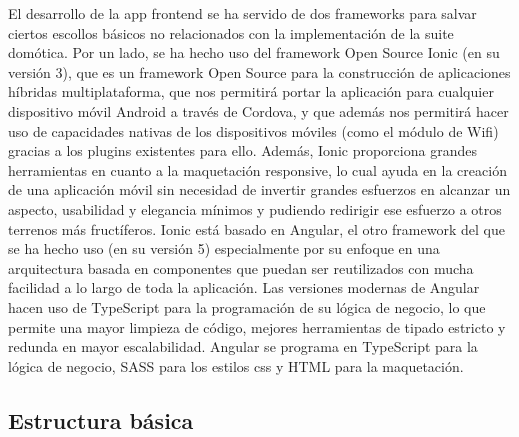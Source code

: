 El desarrollo de la app frontend se ha servido de dos frameworks para salvar ciertos escollos básicos no relacionados con la implementación de la suite domótica. Por un lado, se ha hecho uso del framework Open Source Ionic (en su versión 3), que es un framework Open Source para la construcción de aplicaciones híbridas multiplataforma, que nos permitirá portar la aplicación para cualquier dispositivo móvil Android a través de Cordova, y que además nos permitirá hacer uso de capacidades nativas de los dispositivos móviles (como el módulo de Wifi) gracias a los plugins existentes para ello. Además, Ionic proporciona grandes herramientas en cuanto a la maquetación responsive, lo cual ayuda en la creación de una aplicación móvil sin necesidad de invertir grandes esfuerzos en alcanzar un aspecto, usabilidad y elegancia mínimos y pudiendo redirigir ese esfuerzo a otros terrenos más fructíferos. Ionic está basado en Angular, el otro framework del que se ha hecho uso (en su versión 5) especialmente por su enfoque en una arquitectura basada en componentes que puedan ser reutilizados con mucha facilidad a lo largo de toda la aplicación. Las versiones modernas de Angular hacen uso de TypeScript para la programación de su lógica de negocio, lo que permite una mayor limpieza de código, mejores herramientas de tipado estricto y redunda en mayor escalabilidad. Angular se programa en TypeScript para la lógica de negocio, SASS para los estilos css y HTML para la maquetación.


\subsection{Estructura básica}
\label{ch:Capitulo4.5.2}

